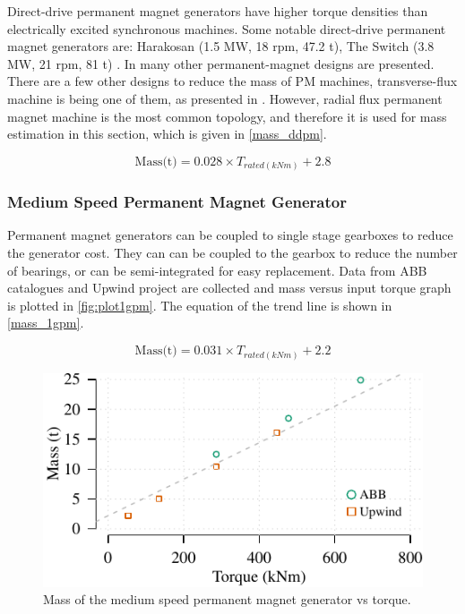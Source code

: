 \documentclass{article}\usepackage{graphicx, color}
\makeatletter
\def\maxwidth{ %
  \ifdim\Gin@nat@width>\linewidth
    \linewidth
  \else
    \Gin@nat@width
  \fi
}
\newenvironment{knitrout}{}{} %
\makeatother
\begin{document}
Direct-drive permanent magnet generators have higher torque densities than electrically excited synchronous machines. Some notable direct-drive permanent magnet generators are: Harakosan (1.5 MW, 18 rpm, 47.2 t), The Switch (3.8 MW, 21 rpm, 81 t) \cite{Duan2009}. In \cite{Bang2008,upwind2011} many other permanent-magnet designs are presented. There are a few other designs to reduce the mass of PM machines, transverse-flux machine is being one of them, as presented in \cite{Bang2009}. However, radial flux permanent magnet machine is the most common topology, and therefore it is used for mass estimation in this section, which is given in \autoref{mass_ddpm}.

\begin{equation}
  \text{Mass(t)} = 0.028 \times {T_{rated(kNm)}} + 2.8
  \label{mass_ddpm}
\end{equation}

\subsubsection{Medium Speed Permanent Magnet Generator}

Permanent magnet generators can be coupled to single stage gearboxes to reduce the generator cost. They can can be coupled to the gearbox to reduce the number of bearings, or can be semi-integrated for easy replacement. Data from ABB catalogues \cite{ABB2012} and Upwind project are collected and mass versus input torque graph is plotted in \autoref{fig:plot1gpm}. The equation of the trend line is shown in \autoref{mass_1gpm}. 

\begin{equation}
  \text{Mass(t)} = 0.031 \times {T_{rated(kNm)}} + 2.2
  \label{mass_1gpm}
\end{equation}

\begin{knitrout}
\color{fgcolor}\begin{figure}[]

\includegraphics[width=\maxwidth]{figure/plot1gpm} \caption[Mass of the medium speed permanent magnet generator vs torque]{Mass of the medium speed permanent magnet generator vs torque.\label{fig:plot1gpm}}
\end{figure}


\end{knitrout}
\end{document}
